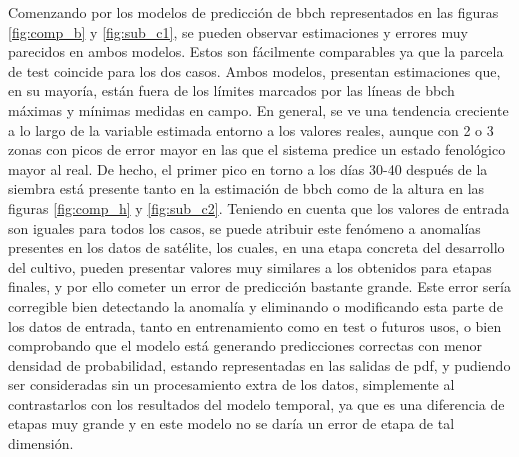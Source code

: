 \par Comenzando por los modelos de predicción de \gls{bbch} representados en las figuras \ref{fig:comp_b} y \ref{fig:sub_c1}, se pueden observar estimaciones y errores muy parecidos en ambos modelos. Estos son fácilmente comparables ya que la parcela de test coincide para los dos casos. Ambos modelos, presentan estimaciones que, en su mayoría, están fuera de los límites marcados por las líneas de \gls{bbch} máximas y mínimas medidas en campo. En general, se ve una tendencia creciente a lo largo de la variable estimada entorno a los valores reales, aunque con 2 o 3 zonas con picos de error mayor en las que el sistema predice un estado fenológico mayor al real. De hecho, el primer pico en torno a los días 30-40 después de la siembra está presente tanto en la estimación de \gls{bbch} como de la altura en las figuras \ref{fig:comp_h} y \ref{fig:sub_c2}. Teniendo en cuenta que los valores de entrada son iguales para todos los casos, se puede atribuir este fenómeno a anomalías presentes en los datos de satélite, los cuales, en  una etapa concreta del desarrollo del cultivo, pueden presentar valores muy similares a los obtenidos para etapas finales, y por ello cometer un error de predicción bastante grande. Este error sería corregible bien detectando la anomalía y eliminando o modificando esta parte de los datos de entrada, tanto en entrenamiento como en test o futuros usos, o bien comprobando que el modelo está generando predicciones correctas con menor densidad de probabilidad, estando representadas en las salidas de \gls{pdf}, y pudiendo ser consideradas sin un procesamiento extra de los datos, simplemente al contrastarlos con los resultados del modelo temporal, ya que es una diferencia de etapas muy grande y en este modelo no se daría un error de etapa de tal dimensión. 
\\

